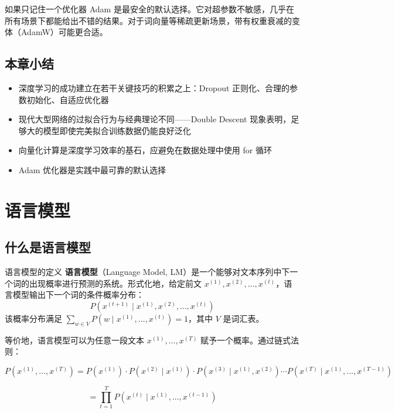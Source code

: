 \documentclass[a4paper]{article}
\begin{document}
\begin{knowledgebox}{如果只记住一个优化器}
Adam 是最安全的默认选择。它对超参数不敏感，几乎在所有场景下都能给出不错的结果。对于词向量等稀疏更新场景，带有权重衰减的变体（AdamW）可能更合适。
\end{knowledgebox}

\subsection{本章小结}

\begin{itemize}
    \item 深度学习的成功建立在若干关键技巧的积累之上：Dropout 正则化、合理的参数初始化、自适应优化器
    \item 现代大型网络的过拟合行为与经典理论不同——Double Descent 现象表明，足够大的模型即使完美拟合训练数据仍能良好泛化
    \item 向量化计算是深度学习效率的基石，应避免在数据处理中使用 for 循环
    \item Adam 优化器是实践中最可靠的默认选择
\end{itemize}


\section{语言模型}

\subsection{什么是语言模型}

\begin{importantbox}{语言模型的定义}
\textbf{语言模型}（Language Model, LM）是一个能够对文本序列中下一个词的出现概率进行预测的系统。形式化地，给定前文 $x^{(1)}, x^{(2)}, \ldots, x^{(t)}$，语言模型输出下一个词的条件概率分布：
$$P(x^{(t+1)} \mid x^{(1)}, x^{(2)}, \ldots, x^{(t)})$$
该概率分布满足 $\sum_{w \in V} P(w \mid x^{(1)}, \ldots, x^{(t)}) = 1$，其中 $V$ 是词汇表。
\end{importantbox}

等价地，语言模型可以为任意一段文本 $x^{(1)}, \ldots, x^{(T)}$ 赋予一个概率。通过链式法则：

$$P(x^{(1)}, \ldots, x^{(T)}) = P(x^{(1)}) \cdot P(x^{(2)} \mid x^{(1)}) \cdot P(x^{(3)} \mid x^{(1)}, x^{(2)}) \cdots P(x^{(T)} \mid x^{(1)}, \ldots, x^{(T-1)})$$

$$= \prod_{t=1}^{T} P(x^{(t)} \mid x^{(1)}, \ldots, x^{(t-1)})$$
\end{document}
